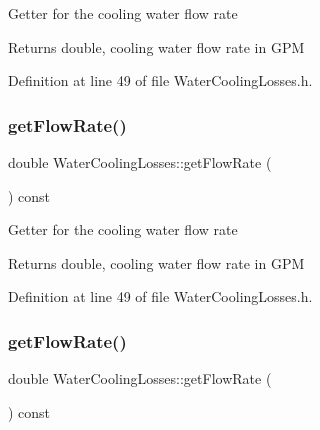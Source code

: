 Getter for the cooling water flow rate

\begin{DoxyReturn}{Returns}
double, cooling water flow rate in G\+PM 
\end{DoxyReturn}


Definition at line 49 of file Water\+Cooling\+Losses.\+h.

\mbox{\label{class_water_cooling_losses_a47f1b7d46f0e34ae898150a7c69e5f18}} 
\subsubsection{\texorpdfstring{get\+Flow\+Rate()}{getFlowRate()}\hspace{0.1cm}{\footnotesize\ttfamily [2/3]}}
{\footnotesize\ttfamily double Water\+Cooling\+Losses\+::get\+Flow\+Rate (\begin{DoxyParamCaption}{ }\end{DoxyParamCaption}) const\hspace{0.3cm}{\ttfamily [inline]}}

Getter for the cooling water flow rate

\begin{DoxyReturn}{Returns}
double, cooling water flow rate in G\+PM 
\end{DoxyReturn}


Definition at line 49 of file Water\+Cooling\+Losses.\+h.

\mbox{\label{class_water_cooling_losses_a47f1b7d46f0e34ae898150a7c69e5f18}} 
\subsubsection{\texorpdfstring{get\+Flow\+Rate()}{getFlowRate()}\hspace{0.1cm}{\footnotesize\ttfamily [3/3]}}
{\footnotesize\ttfamily double Water\+Cooling\+Losses\+::get\+Flow\+Rate (\begin{DoxyParamCaption}{ }\end{DoxyParamCaption}) const\hspace{0.3cm}{\ttfamily [inline]}}

